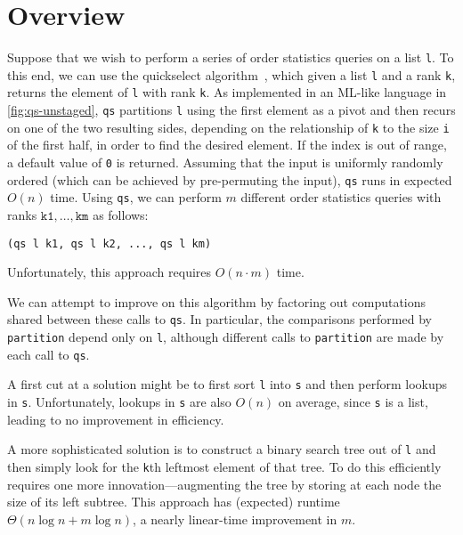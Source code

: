 
\section{Overview}
\label{sec:overview}

\begin{abstrsyn}

Suppose that we wish to perform a series of order statistics queries
on a list \texttt{l}. To this end, we can use the quickselect
algorithm~\cite{Hoare:1961}, which given a list \texttt{l} and a rank
\texttt{k}, returns the element of \texttt{l} with rank \texttt{k}.
As implemented in an ML-like language in \ref{fig:qs-unstaged},
\texttt{qs} partitions \texttt{l} using the first element as
a pivot and then recurs on one of the two resulting sides, depending on
the relationship of \texttt{k} to the size \texttt{i} of the first half, in
order to find the desired element.  
If the index is out of range, a default value of \texttt{0} is returned.
Assuming that the input is uniformly
randomly ordered (which can be achieved by pre-permuting the input), \texttt{qs}
runs in expected $O(n)$ time.
%
Using \texttt{qs}, we can perform $m$ different order statistics queries with
ranks $\mathtt{k1},\dots,\mathtt{km}$ as follows:
%
\begin{lstlisting}
(qs l k1, qs l k2, ..., qs l km)
\end{lstlisting}
%
Unfortunately, this approach requires $O(n \cdot m)$ time.

We can attempt to improve on this algorithm by factoring out computations shared
between these calls to \texttt{qs}. In particular, the comparisons performed by
\texttt{partition} depend only on \texttt{l}, although different calls to
\texttt{partition} are made by each call to \texttt{qs}.

A first cut at a solution might be to first sort \texttt{l} into
\texttt{s} and then perform lookups in \texttt{s}.
Unfortunately, lookups in \texttt{s} are also $O(n)$ on average, since
\texttt{s} is a list, leading to no improvement in efficiency.  

A more sophisticated solution is to construct a binary search
tree out of \texttt{l} and then simply look for the \texttt{k}th
leftmost element of that tree. To do this efficiently requires one more
innovation---augmenting the tree by storing at each node the size of its left
subtree. This approach has (expected) runtime $\Theta(n\log{n} + m\log{n})$, a
nearly linear-time improvement in $m$.


\end{abstrsyn}

